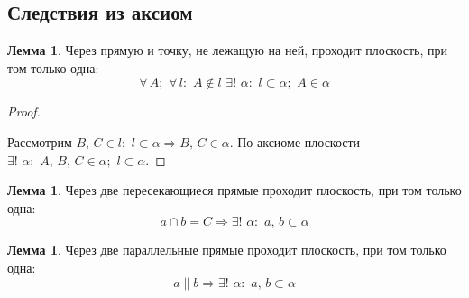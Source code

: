 \documentclass[12pt]{article}
\theoremstyle{definition}
\newtheorem{lemma}[theorem]{Лемма}
\begin{document}
\subsection{Следствия из аксиом}

\begin{lemma}
    Через прямую и точку, не лежащую на ней, проходит плоскость, при том только одна:
    $$\forall\,A;\,\,\forall\,l:\,\,A\notin l\,\,\exists!\,\,\alpha:\,\,l\subset\alpha;\,\,A\in\alpha$$
\end{lemma}

\begin{proof}
    $ $\newline
    \begin{center}
    \end{center}
    Рассмотрим $B,\,C\in l:\,\,l\subset\alpha\Longrightarrow B,\,C\in\alpha.$ По аксиоме плоскости $\exists!\,\,\alpha:\,\,A,\,B,\,C\in\alpha;\,\,l\subset\alpha.$
\end{proof}

\begin{lemma}
    Через две пересекающиеся прямые проходит плоскость, при том только одна:
    $$a\cap b = C\Longrightarrow\exists!\,\,\alpha:\,\,a,\,b\subset\alpha$$
\end{lemma}
\begin{lemma}
    Через две параллельные прямые проходит плоскость, при том только одна:
    $$a\parallel b\Longrightarrow\exists!\,\,\alpha:\,\,a,\,b\subset\alpha$$
\end{lemma}
\end{document}
